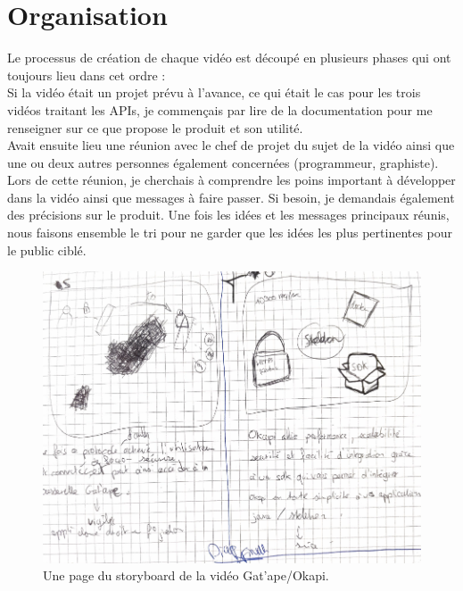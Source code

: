 \section{Organisation}
Le processus de création de chaque vidéo est découpé en plusieurs phases qui ont toujours lieu dans cet ordre :\\

Si la vidéo était un projet prévu à l'avance, ce qui était le cas pour les trois vidéos traitant les APIs, je commençais par lire de la documentation pour me renseigner sur ce que propose le produit et son utilité.\\

Avait ensuite lieu une réunion avec le chef de projet du sujet de la vidéo ainsi que une ou deux autres personnes également concernées (programmeur, graphiste). Lors de cette réunion, je cherchais à comprendre les poins important à développer dans la vidéo ainsi que messages à faire passer. Si besoin, je demandais également des précisions sur le produit. Une fois les idées et les messages principaux réunis, nous faisons ensemble le tri pour ne garder que les idées les plus pertinentes pour le public ciblé.\\





\begin{figure}[htp]
  \centering
  \includegraphics[width=15cm]{images/sb/sb1}
  \caption{Une page du storyboard de la vidéo Gat'ape/Okapi.}
  \label{sbzbus}
\end{figure}




